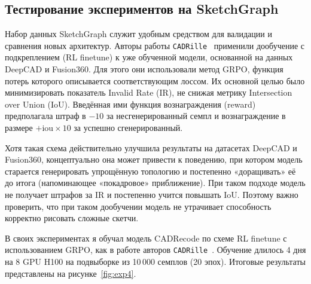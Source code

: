 \newpage

\subsection{Тестирование экспериментов на SketchGraph}

Набор данных SketchGraph служит удобным средством для валидации и сравнения новых архитектур. Авторы работы \texttt{CADRille}~\cite{kolodiazhnyi25_cadrille} применили дообучение с подкреплением (RL finetune) к уже обученной модели, основанной на данных DeepCAD и Fusion360. Для этого они использовали метод GRPO, функция потерь которого описывается соответствующим лоссом. Их основной целью было минимизировать показатель Invalid Rate (IR), не снижая метрику Intersection over Union (IoU). Введённая ими функция вознаграждения (reward) предполагала штраф в \(-10\) за несгенерированный семпл и вознаграждение в размере \(+ \mathrm{iou} \times 10\) за успешно сгенерированный.

Хотя такая схема действительно улучшила результаты на датасетах DeepCAD и Fusion360, концептуально она может привести к поведению, при котором модель старается генерировать упрощённую топологию и постепенно «доращивать» её до итога (напоминающее «покадровое» приближение). При таком подходе модель не получает штрафов за IR и постепенно учится повышать IoU. Поэтому важно проверить, что при таком дообучении модель не утрачивает способность корректно рисовать сложные скетчи.

В своих экспериментах я обучал модель CADRecode по схеме RL finetune с использованием GRPO, как в работе авторов \texttt{CADRille}~\cite{kolodiazhnyi25_cadrille}. Обучение длилось 4 дня на 8 GPU H100 на подвыборке из 10\,000 семплов (20 эпох). Итоговые результаты представлены на рисунке~\ref{fig:exp4}.

